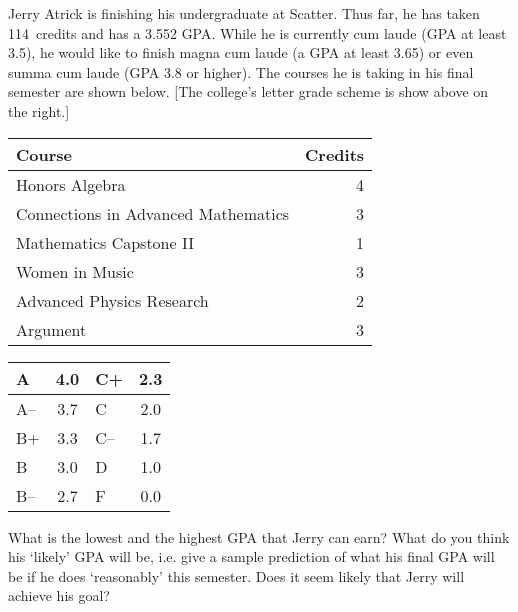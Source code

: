 \documentclass[11pt,letterpaper]{article}
\begin{document}
\newpage



 Jerry Atrick is finishing his undergraduate at Scatter. Thus far, he has taken 114~credits and has a 3.552 GPA. While he is currently cum laude (GPA at least 3.5), he would like to finish magna cum laude (a GPA at least 3.65) or even summa cum laude (GPA 3.8 or higher). The courses he is taking in his final semester are shown below.  [The college's letter grade scheme is show above on the right.] \par
	\begin{table}[!ht]
	\centering
	\begin{tabular}{lr}
	Course & Credits \\ \hline
	Honors Algebra & 4 \\
	Connections in Advanced Mathematics & 3 \\
	Mathematics Capstone II & 1 \\
	Women in Music & 3 \\
	Advanced Physics Research & 2 \\
	Argument & 3
	\end{tabular} \hspace{1cm}
        \begin{tabular}{|l||c|l||c|} \hline
        A & 4.0 & C+ & 2.3 \\ \hline
        A-- & 3.7 & C & 2.0 \\ \hline
        B+ & 3.3 & C-- & 1.7 \\ \hline
        B & 3.0 & D & 1.0 \\ \hline
        B-- & 2.7 & F & 0.0 \\ \hline
        \end{tabular}
	\end{table} \par
What is the lowest and the highest GPA that Jerry can earn? What do you think his `likely' GPA will be, i.e. give a sample prediction of what his final GPA will be if he does `reasonably' this semester. Does it seem likely that Jerry will achieve his goal? 



\newpage
\end{document}
